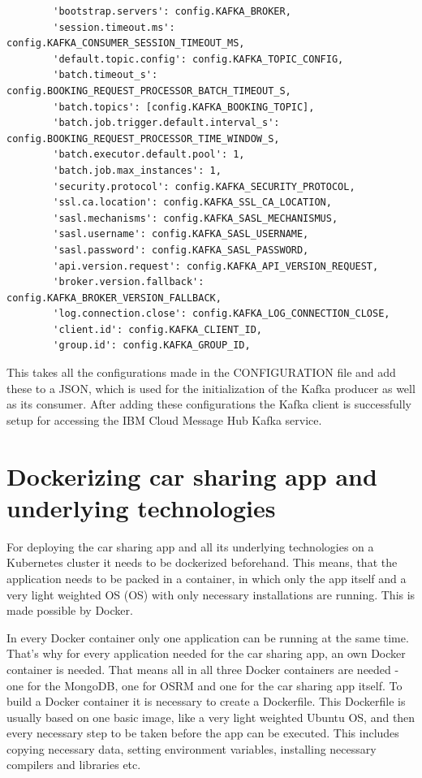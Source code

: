 \begin{lstlisting}
        'bootstrap.servers': config.KAFKA_BROKER,
        'session.timeout.ms': config.KAFKA_CONSUMER_SESSION_TIMEOUT_MS,
        'default.topic.config': config.KAFKA_TOPIC_CONFIG,
        'batch.timeout_s': config.BOOKING_REQUEST_PROCESSOR_BATCH_TIMEOUT_S,
        'batch.topics': [config.KAFKA_BOOKING_TOPIC],
        'batch.job.trigger.default.interval_s': config.BOOKING_REQUEST_PROCESSOR_TIME_WINDOW_S,
        'batch.executor.default.pool': 1,
        'batch.job.max_instances': 1,
        'security.protocol': config.KAFKA_SECURITY_PROTOCOL,
        'ssl.ca.location': config.KAFKA_SSL_CA_LOCATION,
        'sasl.mechanisms': config.KAFKA_SASL_MECHANISMUS,
        'sasl.username': config.KAFKA_SASL_USERNAME,
        'sasl.password': config.KAFKA_SASL_PASSWORD,
        'api.version.request': config.KAFKA_API_VERSION_REQUEST,
        'broker.version.fallback': config.KAFKA_BROKER_VERSION_FALLBACK,
        'log.connection.close': config.KAFKA_LOG_CONNECTION_CLOSE,
        'client.id': config.KAFKA_CLIENT_ID,
        'group.id': config.KAFKA_GROUP_ID,
\end{lstlisting}

This takes all the configurations made in the CONFIGURATION file and add these to a JSON, which is used for the initialization of the Kafka producer as well as its consumer. After adding these configurations the Kafka client is successfully setup for accessing the IBM Cloud Message Hub Kafka service.

\section{Dockerizing car sharing app and underlying technologies}

For deploying the car sharing app and all its underlying technologies on a Kubernetes cluster it needs to be dockerized beforehand. This means, that the application needs to be packed in a container, in which only the app itself and a very light weighted \acs{OS} (\acl{OS}) with only necessary installations are running. This is made possible by Docker.

In every Docker container only one application can be running at the same time. That's why for every application needed for the car sharing app, an own Docker container is needed. That means all in all three Docker containers are needed - one for the MongoDB, one for OSRM and one for the car sharing app itself. 
To build a Docker container it is necessary to create a Dockerfile. This Dockerfile is usually based on one basic image, like a very light weighted Ubuntu OS, and then every necessary step to be taken before the app can be executed. This includes copying necessary data, setting environment variables, installing necessary compilers and libraries etc. 

